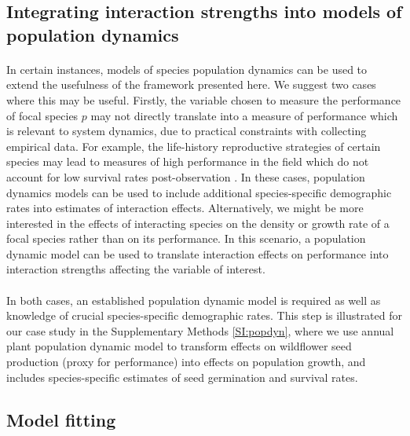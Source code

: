 \documentclass[a4,12pt]{article}
\begin{document}
\begin{refsection}
    \subsection{Integrating interaction strengths into models of population dynamics}

        \paragraph{}
        In certain instances, models of species population dynamics can be used to extend the usefulness of the framework presented here. We suggest two cases where this may be useful. Firstly, the variable chosen to measure the performance of focal species $p$ may not directly translate into a measure of performance which is relevant to system dynamics, due to practical constraints with collecting empirical data. For example, the life-history reproductive strategies of certain species may lead to measures of high performance in the field which do not account for low survival rates post-observation \parencite{Broekman2020}. In these cases, population dynamics models can be used to include additional species-specific demographic rates into estimates of interaction effects. Alternatively, we might be more interested in the effects of interacting species on the density or growth rate of a focal species rather than on its performance. In this scenario, a population dynamic model can be used to translate interaction effects on performance into interaction strengths affecting the variable of interest. 

        \paragraph{}
        In both cases, an established population dynamic model is required as well as knowledge of crucial species-specific demographic rates. This step is illustrated for our case study in the Supplementary Methods \ref{SI:popdyn}, where we use annual plant population dynamic model to transform effects on wildflower seed production (proxy for performance) into effects on population growth, and includes species-specific estimates of seed germination and survival rates. 


    \subsection{Model fitting}


\end{refsection}
\end{document}
